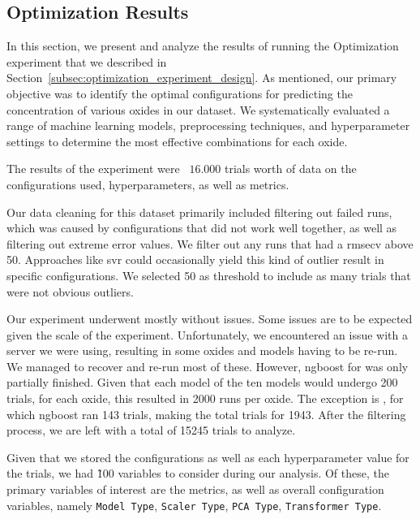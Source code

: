 \subsection{Optimization Results}\label{sec:optimization_results}
In this section, we present and analyze the results of running the Optimization experiment that we described in Section~\ref{subsec:optimization_experiment_design}.
As mentioned, our primary objective was to identify the optimal configurations for predicting the concentration of various oxides in our dataset.
We systematically evaluated a range of machine learning models, preprocessing techniques, and hyperparameter settings to determine the most effective combinations for each oxide.

The results of the experiment were ~$16.000$ trials worth of data on the configurations used, hyperparameters, as well as metrics.

Our data cleaning for this dataset primarily included filtering out failed runs, which was caused by configurations that did not work well together, as well as filtering out extreme error values.
We filter out any runs that had a \gls{rmsecv} above 50.
Approaches like \gls{svr} could occasionally yield this kind of outlier result in specific configurations.
We selected 50 as threshold to include as many trials that were not obvious outliers.

Our experiment underwent mostly without issues.
Some issues are to be expected given the scale of the experiment.
Unfortunately, we encountered an issue with a server we were using, resulting in some oxides and models having to be re-run.
We managed to recover and re-run most of these.
However, \gls{ngboost} for  was only partially finished.
Given that each model of the ten models would undergo 200 trials, for each oxide, this resulted in 2000 runs per oxide.
The exception is , for which \gls{ngboost} ran 143 trials, making the total trials for  1943.
After the filtering process, we are left with a total of 15245 trials to analyze.

Given that we stored the configurations as well as each hyperparameter value for the trials, we had \~100 variables to consider during our analysis.
Of these, the primary variables of interest are the metrics, as well as overall configuration variables, namely \texttt{Model Type}, \texttt{Scaler Type}, \texttt{PCA Type}, \texttt{Transformer Type}.

